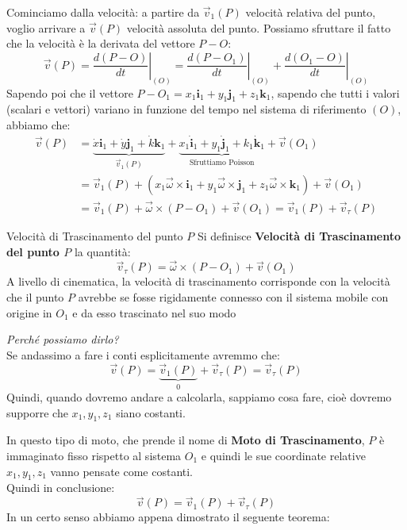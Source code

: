 \documentclass[11pt,a4paper,twoside]{article}
\theoremstyle{definition}
\begin{document}
Cominciamo dalla velocità: a partire da $\vec v_1(P)$ velocità relativa del punto, voglio arrivare a $\vec v(P)$ velocità assoluta del punto. Possiamo sfruttare il fatto che la velocità è la derivata del vettore $P-O$:
\[ \vec v(P) = \left.\frac{d(P-O)}{dt}\right|_{(O)} = \left.\frac{d(P-O_1)}{dt}\right|_{(O)} + \left.\frac{d(O_1-O)}{dt}\right|_{(O)} \]
Sapendo poi che il vettore $P-O_1 = x_1 \mathbf i_1 + y_1 \mathbf j_1 + z_1 \mathbf k_1$, sapendo che tutti i valori (scalari e vettori) variano in funzione del tempo nel sistema di riferimento $(O)$, abbiamo che:
\begin{align*}
	\vec v(P) &= \underbrace{\dot x \mathbf i_1 + \dot y \mathbf j_1 + \dot k \mathbf k_1}_{\vec v_1(P)} + \underbrace{x_1 \dot{\mathbf i}_1 + y_1 \dot{\mathbf j}_1 + k_1 \dot{\mathbf k}_1}_{\text{Sfruttiamo Poisson}} + \vec v(O_1)\\
	&= \vec v_1(P) + (x_1 \vec \omega \times \mathbf i_1 + y_1 \vec \omega \times \mathbf j_1 + z_1 \vec \omega \times \mathbf k_1) + \vec v(O_1)\\
	&= \vec v_1(P) + \vec \omega \times (P-O_1) + \vec v(O_1) = \vec v_1(P) + \vec v_\tau (P)
\end{align*}

\begin{defn}{Velocità di Trascinamento del punto $P$}{}
	Si definisce \textbf{Velocità di Trascinamento del punto $P$} la quantità:
	\[ \vec v_\tau(P) = \vec \omega \times (P-O_1) + \vec v(O_1) \]
	A livello di cinematica, la velocità di trascinamento corrisponde con la velocità che il punto $P$ avrebbe se fosse rigidamente connesso con il sistema mobile con origine in $O_1$ e da esso trascinato nel suo modo
\end{defn}

\textit{Perché possiamo dirlo?}\\
Se andassimo a fare i conti esplicitamente avremmo che:
\[ \vec v(P) = \underbrace{\vec v_1(P)}_{0} + \vec v_\tau(P) = \vec v_\tau(P) \]
Quindi, quando dovremo andare a calcolarla, sappiamo cosa fare, cioè dovremo supporre che $x_1,y_1, z_1$ siano costanti.

In questo tipo di moto, che prende il nome di \textbf{Moto di Trascinamento}, $P$ è immaginato fisso rispetto al sistema $O_1$ e quindi le sue coordinate relative $x_1,y_1,z_1$ vanno pensate come costanti.\\
Quindi in conclusione:
\[ \vec v(P) = \vec v_1(P) + \vec v_\tau (P)\]
In un certo senso abbiamo appena dimostrato il seguente teorema:
\end{document}
